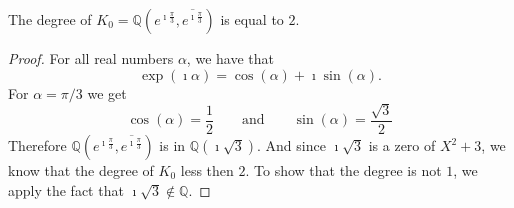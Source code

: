 \begin{lemma}
    \label{lem:degree_K0_angel}
    \leanok
    The degree of $K_0 = \mathbb{Q}(e^{\imath\frac{\pi}{3}},\overline{e^{\imath\frac{\pi}{3}}})$ is equal  to $2$. 
\end{lemma}
\begin{proof}
    \leanok
    For all real numbers $\alpha$, we have that  $$ \exp(\imath \alpha) = \cos(\alpha) + \imath \sin(\alpha).$$
    For $\alpha = \pi / 3$ we get
    \begin{equation*}
        \cos(\alpha) = \frac{1}{2}\qquad \text{and}\qquad \sin(\alpha) = \frac{\sqrt{3}}{2}
    \end{equation*}
    Therefore $\mathbb{Q}(e^{\imath\frac{\pi}{3}},\overline{e^{\imath\frac{\pi}{3}}})$ is in $\mathbb{Q}(\imath\sqrt{3})$.
    And since $\imath\sqrt{3}$ is a zero of $X^2 + 3$, we know that the degree of $K_0$ less then $2$.
    To show that the degree is not $1$, we apply the fact that $\imath\sqrt{3} \notin \mathbb{Q}$.
\end{proof}

